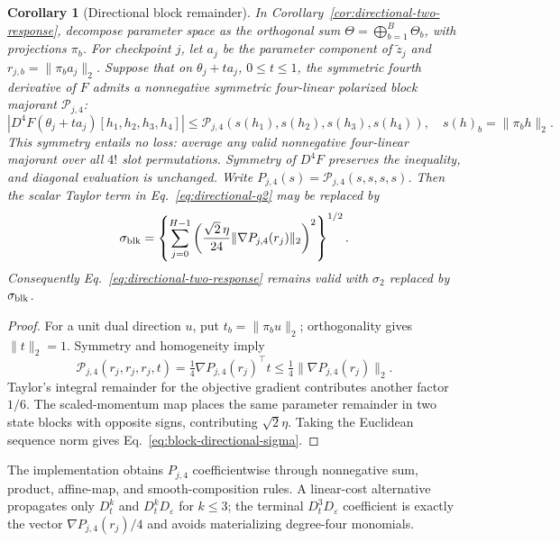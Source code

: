 \documentclass{article}
\newtheorem{corollary}{Corollary}
\begin{document}
\begin{corollary}[Directional block remainder]
\label{cor:block-directional-remainder}
In Corollary~\ref{cor:directional-two-response}, decompose parameter space as
the orthogonal sum $\Theta=\bigoplus_{b=1}^B\Theta_b$, with projections
$\pi_b$.  For checkpoint $j$, let $a_j$ be the parameter component of
$\widetilde z_j$ and $r_{j,b}=\|\pi_ba_j\|_2$.  Suppose that on
$\theta_j+ta_j$, $0\le t\le1$, the symmetric fourth derivative of $F$ admits
a nonnegative symmetric four-linear polarized block majorant
$\mathcal P_{j,4}$:
\begin{equation}
 |D^4F(\theta_j+ta_j)[h_1,h_2,h_3,h_4]|
 \le \mathcal P_{j,4}(s(h_1),s(h_2),s(h_3),s(h_4)),
 \quad s(h)_b=\|\pi_bh\|_2.
 \label{eq:polarized-block-majorant}
\end{equation}
This symmetry entails no loss: average any valid nonnegative four-linear
majorant over all $4!$ slot permutations.  Symmetry of $D^4F$ preserves the
inequality, and diagonal evaluation is unchanged.
Write $P_{j,4}(s)=\mathcal P_{j,4}(s,s,s,s)$.  Then the scalar Taylor term in
Eq.~\eqref{eq:directional-q2} may be replaced by
\begin{equation}
 \sigma_{\rm blk}=
 \left\{\sum_{j=0}^{H-1}
 \left(\frac{\sqrt2\,\eta}{24}
 \|\nabla P_{j,4}(r_j)\|_2\right)^2\right\}^{1/2}.
 \label{eq:block-directional-sigma}
\end{equation}
Consequently Eq.~\eqref{eq:directional-two-response} remains valid with
$\sigma_2$ replaced by $\sigma_{\rm blk}$.
\end{corollary}

\begin{proof}
For a unit dual direction $u$, put $t_b=\|\pi_bu\|_2$; orthogonality gives
$\|t\|_2=1$.  Symmetry and homogeneity imply
\begin{equation}
 \mathcal P_{j,4}(r_j,r_j,r_j,t)
 =\tfrac14\nabla P_{j,4}(r_j)^\top t
 \le\tfrac14\|\nabla P_{j,4}(r_j)\|_2.
\end{equation}
Taylor's integral remainder for the objective gradient contributes another
factor $1/6$.  The scaled-momentum map places the same parameter remainder in
two state blocks with opposite signs, contributing $\sqrt2\eta$.  Taking the
Euclidean sequence norm gives Eq.~\eqref{eq:block-directional-sigma}.
\end{proof}

The implementation obtains $P_{j,4}$ coefficientwise through nonnegative
sum, product, affine-map, and smooth-composition rules.  A linear-cost
alternative propagates only $D_t^k$ and $D_t^kD_\varepsilon$ for $k\le3$;
the terminal $D_t^3D_\varepsilon$ coefficient is exactly the vector
$\nabla P_{j,4}(r_j)/4$ and avoids materializing degree-four monomials.
\end{document}

